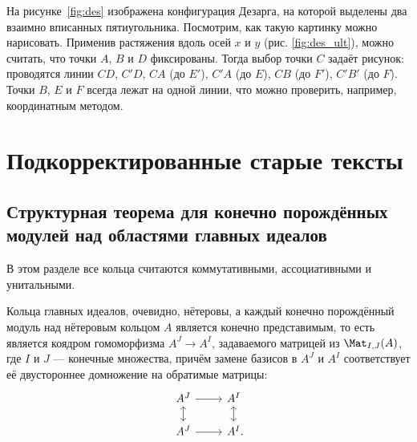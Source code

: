 \documentclass[
	extrafontsizes,
	11pt,
	hyphens,
]{memoir}
\begin{document}
\noindent
На
рисунке~\ref{fig:des} изображена конфигурация Дезарга, на которой выделены два взаимно вписанных пятиугольника. Посмотрим, как такую картинку можно нарисовать.
Применив растяжения вдоль осей \(x\) и \(y\) (рис. \ref{fig:des_ult}), можно считать, что точки \(A\), \(B\) и \(D\) фиксированы. Тогда выбор точки \(C\) задаёт рисунок: проводятся линии \(CD\), \(C'D\), \(CA\) (до \(E'\)), \(C'A\) (до \(E\)), \(CB\) (до \(F'\)), \(C'B'\) (до \(F\)). Точки \(B\), \(E\) и \(F\) всегда лежат на одной линии, что можно проверить, например, координатным методом.



\chapter{Подкорректированные старые тексты}


\section[Структурная теорема для конечно порождённых модулей над областями главных идеалов][Структурная теорема для кон.\ пор.\ модулей над ОГИ]{Структурная теорема для конечно порождённых модулей над областями главных идеалов}

\begin{convention}
В этом разделе все кольца считаются коммутативными, ассоциативными и унитальными.
\end{convention}

\begin{observation}
\label{obs:modpid}
Кольца главных идеалов, очевидно, нётеровы,
а каждый конечно порождённый модуль над нётеровым кольцом \(A\) является конечно представимым, то есть является коядром гомоморфизма
\(A^J \to A^I\), задаваемого матрицей из \(\Mat_{I,J}(A)\), где \(I\) и \(J\) --- конечные множества, причём замене базисов в
\(A^J\) и \(A^I\) соответствует её двустороннее домножение на обратимые матрицы:
\begin{equation*}
\begin{tikzcd}[row sep = scriptsize]
    A^J \arrow{r} \arrow[leftrightarrow]{d} & A^I \arrow[leftrightarrow]{d} \\
    A^J \arrow{r} & A^I\mathrlap{.}
\end{tikzcd}
\label{eq:Am_to_An}
\end{equation*}
\end{observation}

\end{document}
